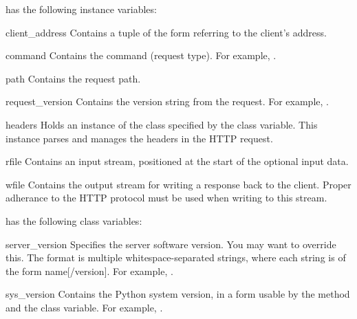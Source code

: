  has the following instance variables:

\begin{memberdesc}{client_address}
Contains a tuple of the form  referring
to the client's address.
\end{memberdesc}

\begin{memberdesc}{command}
Contains the command (request type). For example, .
\end{memberdesc}

\begin{memberdesc}{path}
Contains the request path.
\end{memberdesc}

\begin{memberdesc}{request_version}
Contains the version string from the request. For example,
.
\end{memberdesc}

\begin{memberdesc}{headers}
Holds an instance of the class specified by the 
class variable. This instance parses and manages the headers in
the HTTP request.
\end{memberdesc}

\begin{memberdesc}{rfile}
Contains an input stream, positioned at the start of the optional
input data.
\end{memberdesc}

\begin{memberdesc}{wfile}
Contains the output stream for writing a response back to the client.
Proper adherance to the HTTP protocol must be used when writing
to this stream.
\end{memberdesc}


 has the following class variables:

\begin{memberdesc}{server_version}
Specifies the server software version.  You may want to override
this.
The format is multiple whitespace-separated strings,
where each string is of the form name[/version].
For example, .
\end{memberdesc}

\begin{memberdesc}{sys_version}
Contains the Python system version, in a form usable by the
 method and the  class
variable. For example, .
\end{memberdesc}

